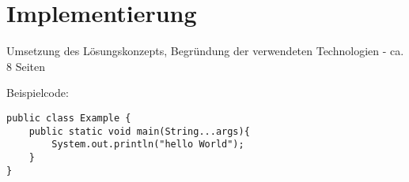 \chapter{Implementierung}
\thispagestyle{fancy}

Umsetzung des Lösungskonzepts, Begründung der verwendeten Technologien - ca. 8 Seiten

Beispielcode:

\begin{lstlisting}
public class Example {
	public static void main(String...args){
		System.out.println("hello World");
	}
}
\end{lstlisting}
